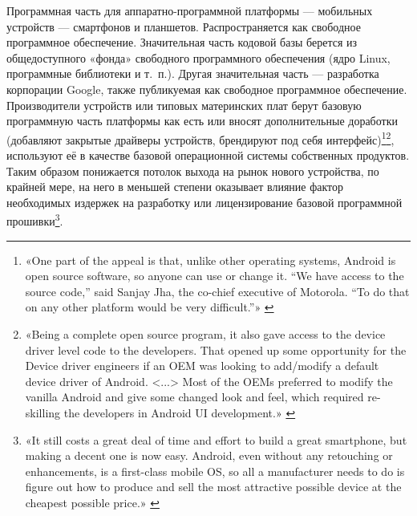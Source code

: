 \documentclass{article}
\begin{document}
Программная часть для аппаратно-программной платформы — мобильных устройств — смартфонов и планшетов. Распространяется как свободное программное обеспечение. Значительная часть кодовой базы берется из общедоступного «фонда» свободного программного обеспечения (ядро Linux, программные библиотеки и т.~п.). Другая значительная часть — разработка корпорации Google, также публикуемая как свободное программное обеспечение. Производители устройств или типовых материнских плат берут базовую программную часть платформы как есть или вносят дополнительные доработки (добавляют закрытые драйверы устройств, брендируют под себя интерфейс)\footnote{«One part of the appeal is that, unlike other operating systems, Android is open source software, so anyone can use or change it. “We have access to the source code,” said Sanjay Jha, the co-chief executive of Motorola. “To do that on any other platform would be very difficult.”» \cite{windowsMobileVsAndroid2009}}\footnote{«Being a complete open source program, it also gave access to the device driver level code to the developers. That opened up some opportunity for the Device driver engineers if an OEM was looking to add/modify a default device driver of Android. <...> Most of the OEMs preferred to modify the vanilla Android and give some changed look and feel, which required re-skilling the developers in Android UI development.» \cite{androidChangedDeviceEngeneering2014}}, используют её в качестве базовой операционной системы собственных продуктов. Таким образом понижается потолок выхода на рынок нового устройства, по крайней мере, на него в меньшей степени оказывает влияние фактор необходимых издержек на разработку или лицензирование базовой программной прошивки\footnote{«It still costs a great deal of time and effort to build a great smartphone, but making a decent one is now easy. Android, even without any retouching or enhancements, is a first-class mobile OS, so all a manufacturer needs to do is figure out how to produce and sell the most attractive possible device at the cheapest possible price.» \cite{androidOemProfit2016}}.
\end{document}
